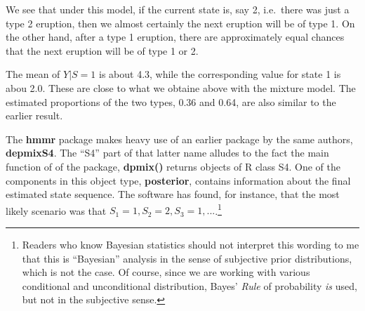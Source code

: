 \documentclass[11pt]{article}
\begin{document}
We see that under this model, if the current state is, say 2, i.e.\
there was just a type 2 eruption, then we almost certainly the next
eruption will be of type 1.  On the other hand, after a type 1 eruption,
there are approximately equal chances that the next eruption will be of
type 1 or 2.

The mean of $Y | S = 1$ is about 4.3, while the corresponding value for
state 1 is abou 2.0.  These are close to what we obtaine above with the
mixture model.  The estimated proportions of the two types, 0.36 and
0.64, are also similar to the earlier result.

The \textbf{hmmr} package makes heavy use of an earlier package by the
same authors, \textbf{depmixS4}.  The ``S4'' part of that latter name
alludes to the fact the main function of of the package, \textbf{dpmix()}
returns objects of R class S4.  One of the components in this object
type, \textbf{posterior}, contains information about the final estimated
state sequence.  The software has found, for instance, that the most
likely scenario was that $S_1 = 1, S_2 = 2, S_3 = 1,
...$.\footnote{Readers who know Bayesian statistics should not interpret
this wording to me that this is ``Bayesian'' analysis in the sense of
subjective prior distributions, which is not the case.  Of course, since
we are working with various conditional and unconditional distribution,
Bayes' \textit{Rule} of probability \textit{is} used, but not in the
subjective sense.}



% 
% 
% 
% 
% 

% 
% 
\end{document}
